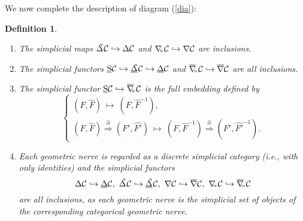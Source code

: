 \documentclass[]{amsart}
\newtheorem{definition}[theorem]{Definition}
\begin{document}
We now  complete the description of diagram (\ref{dia}): \vspace{0.2cm}
\begin{definition}\label{defdia}
\begin{enumerate}
\item[(i)] The simplicial maps ${\ensuremath{\Delta}}\hspace{-4pt}^{^\mathrm{u}}{\ensuremath{\mathcal{C}}} \hookrightarrow {\ensuremath{\Delta}}{\ensuremath{\mathcal{C}}}$ and $\nabla\hspace{-2.5pt}_{^{_\mathrm{u}}}{\ensuremath{\mathcal{C}}}\hookrightarrow \nabla{\ensuremath{\mathcal{C}}}$ are inclusions.

    \vspace{0.2cm}
\item[(ii)] The simplicial functors $\underline{\mathrm{S}}{\ensuremath{\mathcal{C}}}\hookrightarrow {\ensuremath{\underline{\Delta}}}\hspace{-4pt}^{^\mathrm{u}}{\ensuremath{\mathcal{C}}} \hookrightarrow {\ensuremath{\underline{\Delta}}}{\ensuremath{\mathcal{C}}}$ and $\overline{\nabla}\hspace{-2.5pt}_{^{_\mathrm{u}}}{\ensuremath{\mathcal{C}}}\hookrightarrow \overline{\nabla}{\ensuremath{\mathcal{C}}}$ are all inclusions.

\vspace{0.2cm}

\item[(iii)]The simplicial functor $\underline{\mathrm{S}}{\ensuremath{\mathcal{C}}}\hookrightarrow \overline{\nabla}\hspace{-2.5pt}_{^{_\mathrm{u}}}{\ensuremath{\mathcal{C}}}$  is the full embedding defined by
$$\left\{\begin{array}{l} (F,\widehat{F})\ \mapsto\ (F,\widehat{F}^{-1}), \\[4pt]
(F,\widehat{F})\overset{\widehat{\alpha}}\Longrightarrow (F',\widehat{F'})\ \mapsto \
(F,\widehat{F}^{-1})\overset{\widehat{\alpha}}\Longrightarrow
(F',\widehat{F'}^{-1}).\end{array}\right.
$$

    \vspace{0.2cm}

\item[(iv)]Each geometric nerve is regarded as a discrete simplicial category (i.e., with only identities) and the simplicial functors
$${\ensuremath{\Delta}}{\ensuremath{\mathcal{C}}} \hookrightarrow {\ensuremath{\underline{\Delta}}}{\ensuremath{\mathcal{C}}},\  {\ensuremath{\Delta}}\hspace{-4pt}^{^\mathrm{u}}{\ensuremath{\mathcal{C}}}\hookrightarrow {\ensuremath{\underline{\Delta}}}\hspace{-4pt}^{^\mathrm{u}}{\ensuremath{\mathcal{C}}},\
\nabla{\ensuremath{\mathcal{C}}}\hookrightarrow\overline{\nabla}{\ensuremath{\mathcal{C}}},\
\nabla\hspace{-2.5pt}_{^{_\mathrm{u}}}{\ensuremath{\mathcal{C}}}\hookrightarrow
\overline{\nabla}\hspace{-2.5pt}_{^{_\mathrm{u}}}{\ensuremath{\mathcal{C}}}   $$ are all inclusions, as each geometric
nerve is the simplicial set of objects of the corresponding categorical geometric nerve.


\end{enumerate}
\end{definition}
\end{document}
